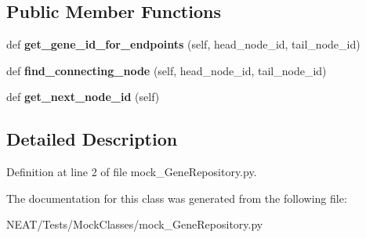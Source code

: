 \subsection*{Public Member Functions}
\begin{DoxyCompactItemize}
\item 
def {\bfseries get\+\_\+gene\+\_\+id\+\_\+for\+\_\+endpoints} (self, head\+\_\+node\+\_\+id, tail\+\_\+node\+\_\+id)\hypertarget{class_n_e_a_t___py_genetics_1_1_n_e_a_t_1_1_tests_1_1_mock_classes_1_1mock___gene_repository_1_1mock___gene_repository_a7b5eef06e8d2486c49acb86b74f43316}{}\label{class_n_e_a_t___py_genetics_1_1_n_e_a_t_1_1_tests_1_1_mock_classes_1_1mock___gene_repository_1_1mock___gene_repository_a7b5eef06e8d2486c49acb86b74f43316}

\item 
def {\bfseries find\+\_\+connecting\+\_\+node} (self, head\+\_\+node\+\_\+id, tail\+\_\+node\+\_\+id)\hypertarget{class_n_e_a_t___py_genetics_1_1_n_e_a_t_1_1_tests_1_1_mock_classes_1_1mock___gene_repository_1_1mock___gene_repository_af8237f68a2528e68c6984225bc9a116f}{}\label{class_n_e_a_t___py_genetics_1_1_n_e_a_t_1_1_tests_1_1_mock_classes_1_1mock___gene_repository_1_1mock___gene_repository_af8237f68a2528e68c6984225bc9a116f}

\item 
def {\bfseries get\+\_\+next\+\_\+node\+\_\+id} (self)\hypertarget{class_n_e_a_t___py_genetics_1_1_n_e_a_t_1_1_tests_1_1_mock_classes_1_1mock___gene_repository_1_1mock___gene_repository_a496072cac2263f4b7213ba45f4458883}{}\label{class_n_e_a_t___py_genetics_1_1_n_e_a_t_1_1_tests_1_1_mock_classes_1_1mock___gene_repository_1_1mock___gene_repository_a496072cac2263f4b7213ba45f4458883}

\end{DoxyCompactItemize}


\subsection{Detailed Description}


Definition at line 2 of file mock\+\_\+\+Gene\+Repository.\+py.



The documentation for this class was generated from the following file\+:\begin{DoxyCompactItemize}
\item 
N\+E\+A\+T/\+Tests/\+Mock\+Classes/mock\+\_\+\+Gene\+Repository.\+py\end{DoxyCompactItemize}
